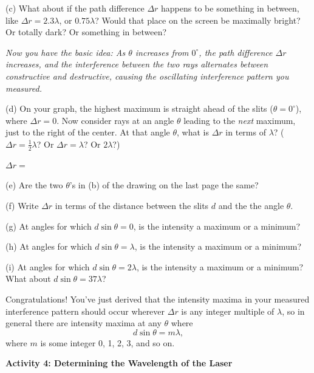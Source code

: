 (c) What about if the path difference $\Delta r$ happens to be something in between, like $\Delta r = 2.3\lambda$, or $0.75\lambda$? Would that place on the screen be maximally bright? Or totally dark? Or something in between?
\answerspace{0.5in}

\textit{Now you have the basic idea: As $\theta$ increases from $0^\circ$,
the path difference $\Delta r$ increases, and the interference between the two rays alternates between constructive and destructive, causing the oscillating interference pattern you measured.}


(d) On your graph, the highest maximum is straight ahead of the slits ($\theta=0^\circ$), where $\Delta r=0$.  Now consider rays at an angle $\theta$ leading to the \textit{next} maximum, just to the right of the center.  At that angle $\theta$, what is $\Delta r$ in terms of $\lambda$?   ($\Delta r=\frac{1}{2}\lambda$?  Or $\Delta r = \lambda$?  Or $2\lambda$?) 

\vspace{0.1in}
\hspace{0.8in}$\Delta r=$
\vspace{0.1in}

(e) Are the two $\theta$'s in (b) of the drawing on the last page the same?
\answerspace{0.2in}

(f) Write $\Delta r$ in terms of the distance between the slits $d$ and the the angle $\theta$.
\answerspace{0.4in}

(g) At angles for which $d \sin \theta = 0$, is the intensity a maximum or a minimum?
\answerspace{0.2in}

(h) At angles for which $d \sin \theta = \lambda$, is the intensity a maximum or a minimum?
\answerspace{0.2in}

(i) At angles for which $d \sin \theta = 2 \lambda$, is the intensity a maximum or a minimum?  What about $d \sin \theta = 37 \lambda$?
\answerspace{0.2in}

Congratulations!  You've just derived that the intensity maxima in your measured interference pattern should occur wherever $\Delta r$ is any integer multiple of $\lambda$, so in general there are intensity maxima at any $\theta$ where
\begin{equation}
d \sin \theta = m \lambda,
\end{equation}
where $m$ is some integer 0, 1, 2, 3, and so on.  



\pagebreak[3]
\textbf{Activity 4: Determining the Wavelength of the Laser }


